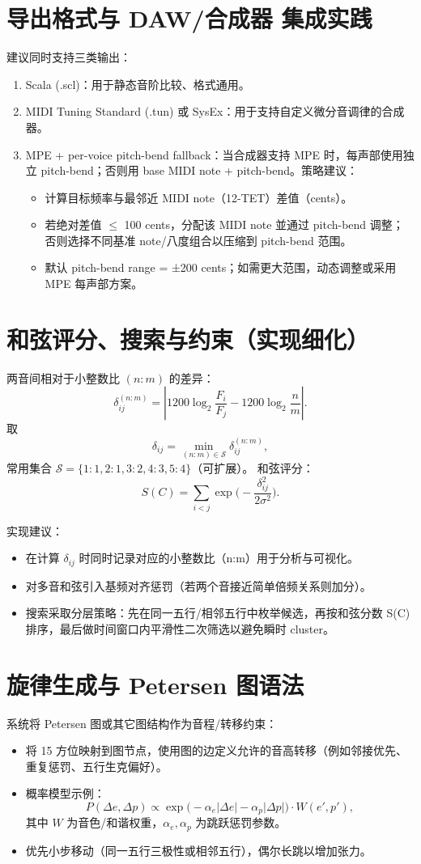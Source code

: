 \documentclass{article}
\begin{document}
\section{导出格式与 DAW/合成器 集成实践}
建议同时支持三类输出：
\begin{enumerate}
  \item Scala (.scl)：用于静态音阶比较、格式通用。
  \item MIDI Tuning Standard (.tun) 或 SysEx：用于支持自定义微分音调律的合成器。
  \item MPE + per-voice pitch-bend fallback：当合成器支持 MPE 时，每声部使用独立 pitch-bend；否则用 base MIDI note + pitch-bend。策略建议：
    \begin{itemize}
      \item 计算目标频率与最邻近 MIDI note（12-TET）差值（cents）。
      \item 若绝对差值 $\le$ 100 cents，分配该 MIDI note 並通过 pitch-bend 调整；否则选择不同基准 note/八度组合以压缩到 pitch-bend 范围。
      \item 默认 pitch-bend range = ±200 cents；如需更大范围，动态调整或采用 MPE 每声部方案。
    \end{itemize}
\end{enumerate}

\section{和弦评分、搜索与约束（实现细化）}
两音间相对于小整数比 $(n:m)$ 的差异：
\[
\delta_{ij}^{(n:m)}=\left|1200\log_2\frac{F_i}{F_j}-1200\log_2\frac{n}{m}\right|.
\]
取
\[
\delta_{ij}=\min_{(n:m)\in\mathcal{S}}\delta_{ij}^{(n:m)},
\]
常用集合 $\mathcal{S}=\{1:1,2:1,3:2,4:3,5:4\}$（可扩展）。
和弦评分：
\[
S(C)=\sum_{i<j}\exp\!\Big(-\frac{\delta_{ij}^2}{2\sigma^2}\Big).
\]

实现建议：
\begin{itemize}
  \item 在计算 $\delta_{ij}$ 时同时记录对应的小整数比（n:m）用于分析与可视化。
  \item 对多音和弦引入基频对齐惩罚（若两个音接近简单倍频关系则加分）。
  \item 搜索采取分层策略：先在同一五行/相邻五行中枚举候选，再按和弦分数 S(C) 排序，最后做时间窗口内平滑性二次筛选以避免瞬时 cluster。
\end{itemize}

\section{旋律生成与 Petersen 图语法}
系统将 Petersen 图或其它图结构作为音程/转移约束：
\begin{itemize}
  \item 将 15 方位映射到图节点，使用图的边定义允许的音高转移（例如邻接优先、重复惩罚、五行生克偏好）。
  \item 概率模型示例：
  \[
  P(\Delta e,\Delta p)\propto \exp\!\big(-\alpha_e|\Delta e|-\alpha_p|\Delta p|\big)\cdot W(e',p'),
  \]
  其中 $W$ 为音色/和谐权重，$\alpha_e,\alpha_p$ 为跳跃惩罚参数。
  \item 优先小步移动（同一五行三极性或相邻五行），偶尔长跳以增加张力。
\end{itemize}
\end{document}
